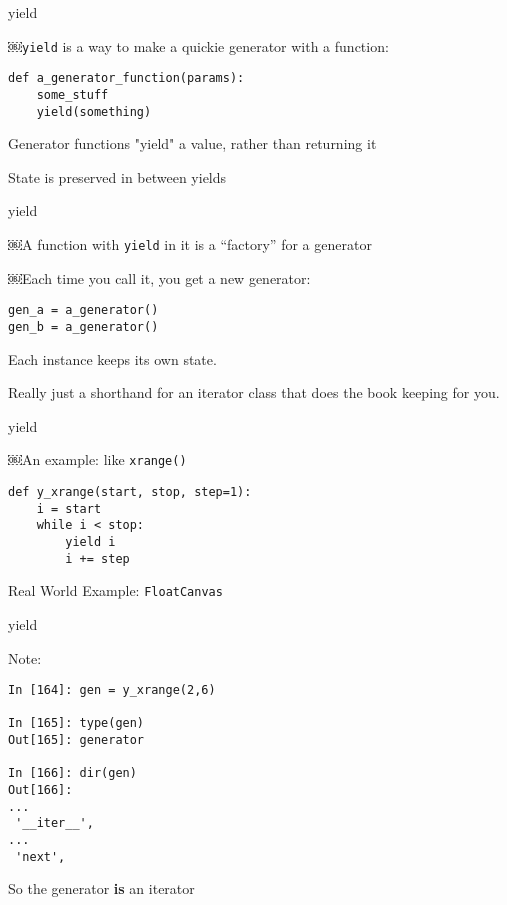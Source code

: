 \documentclass{beamer}
\begin{document}
\begin{frame}[fragile]{yield}

\Large{￼\verb|yield| is a way to make a quickie generator with a function:}

\begin{verbatim}
def a_generator_function(params):
    some_stuff
    yield(something)
\end{verbatim}

\vfill
\Large{ Generator functions "yield" a value, rather than returning it }

\vfill
\Large{ State is preserved in between yields }

\end{frame}

\begin{frame}[fragile]{yield}

\Large{￼A function with \verb|yield| in it is a ``factory'' for a generator}

\vfill
\Large{￼Each time you call it, you get a new generator:}
 
\vfill
\begin{verbatim}
gen_a = a_generator()
gen_b = a_generator()
\end{verbatim}

\vfill
\Large{ Each instance keeps its own state. }

\vfill
\Large{ Really just a shorthand for an iterator class that does the book keeping for you.}

\end{frame}

\begin{frame}[fragile]{yield}

\Large{￼An example: like \verb|xrange()|}

\begin{verbatim}
def y_xrange(start, stop, step=1):
    i = start
    while i < stop:
        yield i
        i += step
\end{verbatim}

\vfill
{\Large Real World Example: \verb|FloatCanvas|}
\end{frame}

\begin{frame}[fragile]{yield}

{\Large Note:}

\begin{verbatim}
In [164]: gen = y_xrange(2,6)

In [165]: type(gen)
Out[165]: generator

In [166]: dir(gen)
Out[166]: 
...
 '__iter__',
...
 'next',
\end{verbatim}
{\Large So the generator {\bf is} an iterator}
\end{frame}
\end{document}
